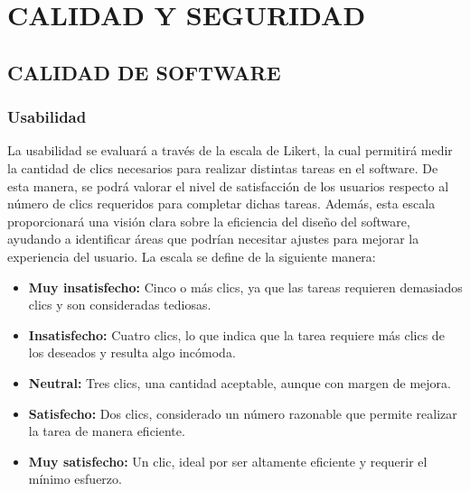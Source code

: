 \chapter{CALIDAD Y SEGURIDAD} 
\section{CALIDAD DE SOFTWARE}
\subsection{Usabilidad}

La usabilidad se evaluará a través de la escala de Likert, la cual permitirá medir la cantidad de clics necesarios para realizar distintas tareas en el software. De esta manera, se podrá valorar el nivel de satisfacción de los usuarios respecto al número de clics requeridos para completar dichas tareas. Además, esta escala proporcionará una visión clara sobre la eficiencia del diseño del software, ayudando a identificar áreas que podrían necesitar ajustes para mejorar la experiencia del usuario. La escala se define de la siguiente manera:

\begin{itemize}[label=$-$, left=0cm, labelsep = 0.9cm, topsep = 0pt, parsep = 0pt]
	\item \textbf{Muy insatisfecho:} Cinco o más clics, ya que las tareas requieren demasiados clics y son consideradas tediosas.		
	\item \textbf{Insatisfecho:} Cuatro clics, lo que indica que la tarea requiere más clics de los deseados y resulta algo incómoda.
	\item \textbf{Neutral:} Tres clics, una cantidad aceptable, aunque con margen de mejora.
	\item \textbf{Satisfecho:} Dos clics, considerado un número razonable que permite realizar la tarea de manera eficiente.
	\item \textbf{Muy satisfecho:} Un clic, ideal por ser altamente eficiente y requerir el mínimo esfuerzo.
\end{itemize}

